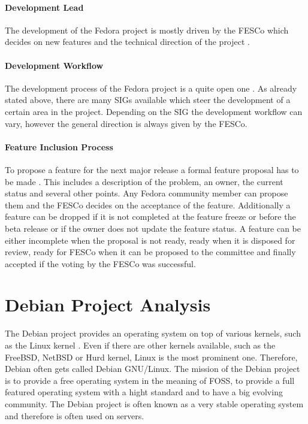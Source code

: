 \paragraph{Development Lead}

The development of the Fedora project is mostly driven by the \ac{FESCo} which
decides on new features and the technical direction of the project
\cite{FedoraFESCo}.

\paragraph{Development Workflow}

The development process of the Fedora project is a quite open one
\cite{FedoraReleaseEngineering,FedoraSIG}. As already stated above, there are
many \acp{SIG} available which steer the development of a certain area in the
project. Depending on the \ac{SIG} the development workflow can vary, however
the general direction is always given by the \ac{FESCo}.

\paragraph{Feature Inclusion Process}

To propose a feature for the next major release a formal feature proposal has
to be made \cite{FedoraFeatures,FedoraFESCo}. This includes a description of
the problem, an owner, the current status and several other points. Any Fedora
community member can propose them and the \ac{FESCo} decides on the acceptance
of the feature. Additionally a feature can be dropped if it is not completed at
the feature freeze or before the beta release or if the owner does not update
the feature status. A feature can be either incomplete when the proposal is not
ready, ready when it is disposed for review, ready for \ac{FESCo} when it can
be proposed to the committee and finally accepted if the voting by the
\ac{FESCo} was successful.


\section{Debian Project Analysis} %


The Debian project provides an operating system on top of various kernels, such
as the Linux kernel \cite{DebianAbout,DebianPorts}. Even if there are other
kernels available, such as the FreeBSD, NetBSD or Hurd kernel, Linux is the
most prominent one. Therefore, Debian often gets called Debian \ac{GNU}/Linux.
The mission of the Debian project is to provide a free operating system in the
meaning of \ac{FOSS}, to provide a full featured operating system with a hight
standard and to have a big evolving community. The Debian project is often
known as a very stable operating system and therefore is often used on servers.

